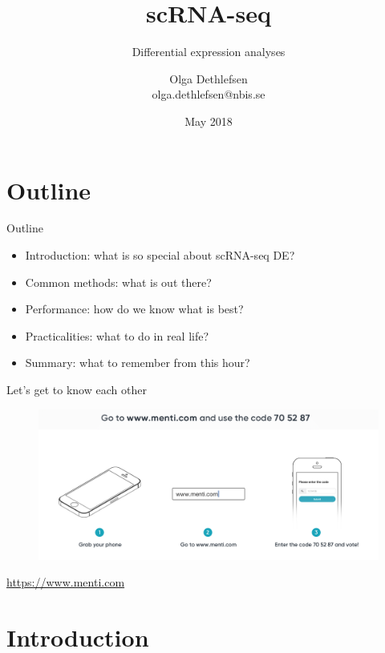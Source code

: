 \documentclass{beamer}\usepackage[]{graphicx}\usepackage[]{color}
\title[scRNA-seq DE]{scRNA-seq}
\subtitle{Differential expression analyses}
\author[Olga]{Olga Dethlefsen\\{\scriptsize olga.dethlefsen@nbis.se}}
\institute[NBIS]{NBIS, National Bioinformatics Infrastructure Sweden\\}
\date[May 2018]{May 2018}
\begin{document}
\begin{frame}
\titlepage
\end{frame}

\logo{}

\section{Outline}
\begin{frame}
\begin{block}{Outline}
\begin{itemize}  \pause
  \item Introduction: what is so special about scRNA-seq DE? \pause
  \item Common methods: what is out there? \pause
  \item Performance: how do we know what is best? \pause
  \item Practicalities: what to do in real life? \pause
  \item Summary: what to remember from this hour? 
 \end{itemize}
\end{block}
\end{frame}

\begin{frame}
\begin{center}
Let's get to know each other
\begin{figure}
\includegraphics[width=12cm]{Images/menti.png}
\end{figure}
\href{https://www.menti.com}{https://www.menti.com}
\end{center}
\end{frame}

\section{Introduction}
\begin{frame}
\begin{center}
\insertsection
\end{center}
\end{frame}
\end{document}
